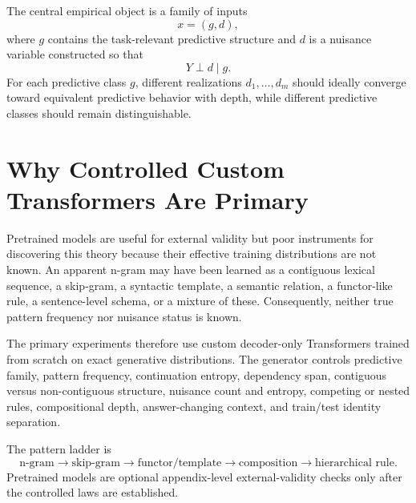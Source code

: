 \documentclass[10pt]{article}
\begin{document}
The central empirical object is a family of inputs
\begin{equation}x=(g,d),\end{equation}
where $g$ contains the task-relevant predictive structure and $d$ is a nuisance variable constructed so that
\begin{equation}Y \perp d \mid g.\end{equation}
For each predictive class $g$, different realizations $d_1,\dots,d_m$ should ideally converge toward equivalent predictive behavior with depth, while different predictive classes should remain distinguishable.

\section{Why Controlled Custom Transformers Are Primary}
Pretrained models are useful for external validity but poor instruments for discovering this theory because their effective training distributions are not known. An apparent n-gram may have been learned as a contiguous lexical sequence, a skip-gram, a syntactic template, a semantic relation, a functor-like rule, a sentence-level schema, or a mixture of these. Consequently, neither true pattern frequency nor nuisance status is known.

The primary experiments therefore use custom decoder-only Transformers trained from scratch on exact generative distributions. The generator controls predictive family, pattern frequency, continuation entropy, dependency span, contiguous versus non-contiguous structure, nuisance count and entropy, competing or nested rules, compositional depth, answer-changing context, and train/test identity separation.

The pattern ladder is
\begin{equation}
\text{n-gram}\rightarrow\text{skip-gram}\rightarrow\text{functor/template}\rightarrow\text{composition}\rightarrow\text{hierarchical rule}.
\end{equation}
Pretrained models are optional appendix-level external-validity checks only after the controlled laws are established.
\end{document}
